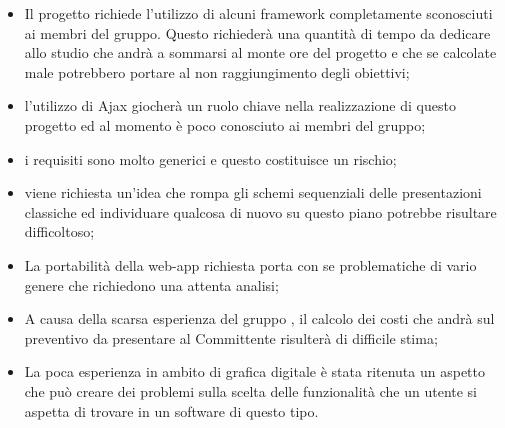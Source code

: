 \begin{itemize}
	\item Il progetto \PROGETTO{} richiede l'utilizzo di alcuni framework completamente sconosciuti ai membri del gruppo. Questo richiederà una quantità di tempo da dedicare allo studio che andrà a sommarsi al monte ore del progetto e che se calcolate male potrebbero portare al non raggiungimento degli obiettivi;
	\item l'utilizzo di Ajax giocherà un ruolo chiave nella realizzazione di questo progetto ed al momento è poco conosciuto ai membri del gruppo;
	\item i requisiti sono molto generici e questo costituisce un rischio;
	\item viene richiesta un’idea che rompa gli schemi sequenziali delle presentazioni classiche ed individuare qualcosa di nuovo su questo piano potrebbe risultare difficoltoso;
	\item La portabilità della web-app richiesta porta con se problematiche di vario genere che richiedono una attenta analisi;
	\item A causa della scarsa esperienza del gruppo \GRUPPO, il calcolo dei costi che andrà sul preventivo da presentare al Committente risulterà di difficile stima;
	\item La poca esperienza in ambito di grafica digitale è stata ritenuta un aspetto che può creare dei problemi sulla scelta delle funzionalità che un utente si aspetta di trovare in un software di questo tipo.
\end{itemize}
